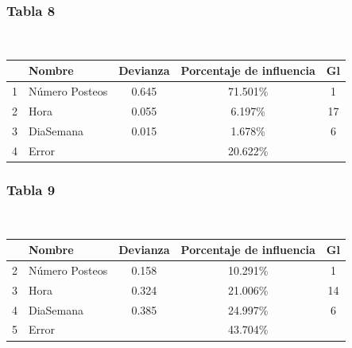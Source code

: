 \documentclass[a4paper,10pt]{article}
\begin{document}
\subsubsection{Tabla 8}

\begin{center}
  \\[0.3cm]
  \begin{tabular}{l|l|c|c|c}
    & Nombre & Devianza & Porcentaje de influencia & Gl \\
    \hline
    1 & Número Posteos & 0.645 & 71.501\% & 1 \\
    2 & Hora & 0.055 & 6.197\% & 17 \\
    3 & DiaSemana & 0.015 & 1.678\% & 6 \\
    4 & Error &  & 20.622\% &  \\
    \hline
  \end{tabular}
\end{center}

\subsubsection{Tabla 9}

\begin{center}
 \\[0.3cm]
  \begin{tabular}{l|l|c|c|c}
    & Nombre & Devianza & Porcentaje de influencia & Gl \\
    \hline
    2 & Número Posteos & 0.158 & 10.291\% & 1 \\
    3 & Hora & 0.324 & 21.006\% & 14 \\
    4 & DiaSemana & 0.385 & 24.997\% & 6 \\
    5 & Error &  & 43.704\% &  \\
    \hline
  \end{tabular} 
\end{center}

 
\\[2cm]
\end{document}
